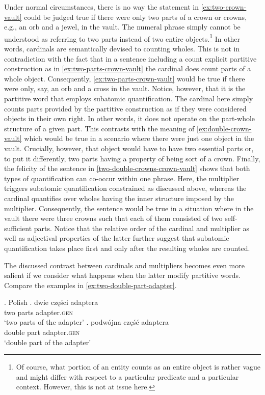 Under normal circumstances, there is no way the statement in \ref{ex:two-crown-vault} could be judged true if there were only two parts of a crown or crowns, e.g., an orb and a jewel, in the vault. The numeral phrase simply cannot be understood as referring to two parts instead of two entire objects.\footnote{Of course, what portion of an entity counts as an entire object is rather vague and might differ with respect to a particular predicate and a particular context. However, this is not at issue here.} In other words, cardinals are semantically devised to counting wholes. This is not in contradiction with the fact that in a sentence including a count explicit partitive construction as in \ref{ex:two-parts-crown-vault} the cardinal does count parts of a whole object. Consequently, \ref{ex:two-parts-crown-vault} would be true if there were only, say, an orb and a cross in the vault. Notice, however, that it is the partitive word that employs subatomic quantification. The cardinal here simply counts parts provided by the partitive construction as if they were considered objects in their own right. In other words, it does not operate on the part-whole structure of a given part. This contrasts with the meaning of \ref{ex:double-crown-vault} which would be true in a scenario where there were just one object in the vault. Crucially, however, that object would have to have two essential parts or, to put it differently, two parts having a property of being sort of a crown. Finally, the felicity of the sentence in \ref{two-double-crowns-crown-vault} shows that both types of quantification can co-occur within one phrase. Here, the multiplier triggers subatomic quantification constrained as discussed above, whereas the cardinal quantifies over wholes having the inner structure imposed by the multiplier. Consequently, the sentence would be true in a situation where in the vault there were three crowns such that each of them consisted of two self-sufficient parts. Notice that the relative order of the cardinal and multiplier as well as adjectival properties of the latter further suggest that subatomic quantification takes place first and only after the resulting wholes are counted.

The discussed contrast between cardinals and multipliers becomes even more salient if we consider what happens when the latter modify partitive words. Compare the examples in \ref{ex:two-double-part-adapter}. 

\ex. Polish\label{ex:two-double-part-adapter}
\ag. dwie części adaptera\\
two parts adapter\textsc{.gen}\\
`two parts of the adapter'\label{ex:two-part-adapter}
\bg. podwójna część adaptera\\
double part adapter\textsc{.gen}\\
`double part of the adapter'\label{ex:double-part-adapter}


